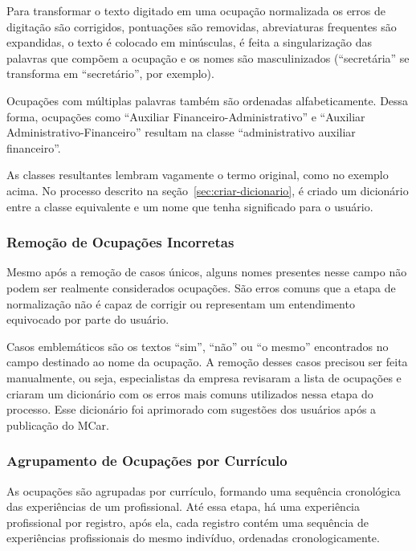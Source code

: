 \documentclass[12pt,a4paper,final]{article}
\begin{document}
Para transformar o texto digitado em uma ocupação normalizada os erros de digitação são corrigidos, pontuações são removidas, abreviaturas frequentes são expandidas, o texto é colocado em minúsculas, é feita a singularização das palavras que compõem a ocupação e os nomes são masculinizados (\enquote{secretária} se transforma em \enquote{secretário}, por exemplo).

Ocupações com múltiplas palavras também são ordenadas alfabeticamente. Dessa forma, ocupações como \enquote{Auxiliar Financeiro-Administrativo} e \enquote{Auxiliar Administrativo-Financeiro} resultam na classe \enquote{administrativo auxiliar financeiro}.

As classes resultantes lembram vagamente o termo original, como no exemplo acima. No processo descrito na seção~\ref{sec:criar-dicionario}, é criado um dicionário entre a classe equivalente e um nome que tenha significado para o usuário.

\subsubsection{Remoção de Ocupações Incorretas} \label{sec:remocao-ocupacoes-incorretas}

Mesmo após a remoção de casos únicos, alguns nomes presentes nesse campo não podem ser realmente considerados ocupações. São erros comuns que a etapa de normalização não é capaz de corrigir ou representam um entendimento equivocado por parte do usuário.

Casos emblemáticos são os textos \enquote{sim}, \enquote{não} ou \enquote{o mesmo} encontrados no campo destinado ao nome da ocupação. A remoção desses casos precisou ser feita manualmente, ou seja, especialistas da empresa revisaram a lista de ocupações e criaram um dicionário com os erros mais comuns utilizados nessa etapa do processo. Esse dicionário foi aprimorado com sugestões dos usuários após a publicação do MCar.

\subsubsection{Agrupamento de Ocupações por Currículo}

As ocupações são agrupadas por currículo, formando uma sequência cronológica das experiências de um profissional. Até essa etapa, há uma experiência profissional por registro, após ela, cada registro contém uma sequência de experiências profissionais do mesmo indivíduo, ordenadas cronologicamente.
\end{document}
